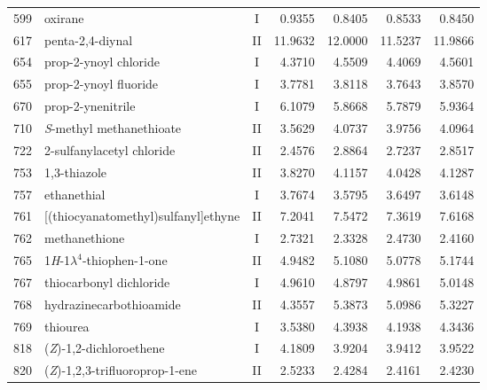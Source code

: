 \begin{longtable}{rlcd{2.5}d{2.5}d{2.5}d{2.5}}
    599  & oxirane                                                & I  & 0.9355  & 0.8405  & 0.8533  & 0.8450  \\
    617  & penta-2,4-diynal                                       & II & 11.9632 & 12.0000 & 11.5237 & 11.9866 \\
    654  & prop-2-ynoyl chloride                                  & I  & 4.3710  & 4.5509  & 4.4069  & 4.5601  \\
    655  & prop-2-ynoyl fluoride                                  & I  & 3.7781  & 3.8118  & 3.7643  & 3.8570  \\
    670  & prop-2-ynenitrile                                      & I  & 6.1079  & 5.8668  & 5.7879  & 5.9364  \\
    710  & \textit{S}-methyl methanethioate                       & II & 3.5629  & 4.0737  & 3.9756  & 4.0964  \\
    722  & 2-sulfanylacetyl chloride                              & II & 2.4576  & 2.8864  & 2.7237  & 2.8517  \\
    753  & 1,3-thiazole                                           & II & 3.8270  & 4.1157  & 4.0428  & 4.1287  \\
    757  & ethanethial                                            & I  & 3.7674  & 3.5795  & 3.6497  & 3.6148  \\
    761  & [(thiocyanatomethyl)sulfanyl]ethyne                    & II & 7.2041  & 7.5472  & 7.3619  & 7.6168  \\
    762  & methanethione                                          & I  & 2.7321  & 2.3328  & 2.4730  & 2.4160  \\
    765  & 1\textit{H}-1$\lambda^4$-thiophen-1-one                & II & 4.9482  & 5.1080  & 5.0778  & 5.1744  \\
    767  & thiocarbonyl dichloride                                & I  & 4.9610  & 4.8797  & 4.9861  & 5.0148  \\
    768  & hydrazinecarbothioamide                                & II & 4.3557  & 5.3873  & 5.0986  & 5.3227  \\
    769  & thiourea                                               & I  & 3.5380  & 4.3938  & 4.1938  & 4.3436  \\
    818  & (\textit{Z})-1,2-dichloroethene                        & I  & 4.1809  & 3.9204  & 3.9412  & 3.9522  \\
    820  & (\textit{Z})-1,2,3-trifluoroprop-1-ene                 & II & 2.5233  & 2.4284  & 2.4161  & 2.4230  \\

\end{longtable}
